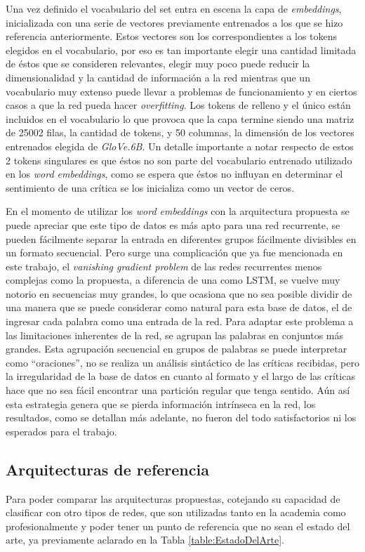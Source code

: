 \documentclass[spanish]{article}
\theoremstyle{definition}
\theoremstyle{remark}
\numberwithin{equation}{section}
\numberwithin{equation}{section} %
\begin{document}
Una vez definido el vocabulario del set entra en escena la capa de \textit{embeddings}, inicializada con una serie de vectores previamente entrenados a los que se hizo referencia anteriormente. Estos vectores son los correspondientes a los tokens elegidos en el vocabulario, por eso es tan importante elegir una cantidad limitada de éstos que se consideren relevantes, elegir muy poco puede reducir la dimensionalidad y la cantidad de información a la red mientras que un vocabulario muy extenso puede llevar a problemas de funcionamiento y en ciertos casos a que la red pueda hacer \textit{overfitting}. Los tokens de relleno y el único están incluidos en el vocabulario lo que provoca que la capa termine siendo una matriz de 25002 filas, la cantidad de tokens, y 50 columnas, la dimensión de los vectores entrenados elegida de \textit{GloVe.6B}. Un detalle importante a notar respecto de estos 2 tokens singulares es que éstos no son parte del vocabulario entrenado utilizado en los \textit{word embeddings}, como se espera que éstos no influyan en determinar el sentimiento de una crítica se los inicializa como un vector de ceros. 
\par
En el momento de utilizar los \textit{word embeddings} con la arquitectura propuesta se puede apreciar que este tipo de datos es más apto para una red recurrente, se pueden fácilmente separar la entrada en diferentes grupos fácilmente divisibles en un formato secuencial. Pero surge una complicación que ya fue mencionada en este trabajo, el \textit{vanishing gradient problem} de las redes recurrentes menos complejas como la propuesta, a diferencia de una como LSTM, se vuelve muy notorio en secuencias muy grandes, lo que ocasiona que no sea posible dividir de una manera que se puede considerar como natural para esta base de datos, el de ingresar cada palabra como una entrada de la red. Para adaptar este problema a las limitaciones inherentes de la red, se agrupan las palabras en conjuntos más grandes. Esta agrupación secuencial en grupos de palabras se puede interpretar como ``oraciones'', no se realiza un análisis sintáctico de las críticas recibidas, pero la irregularidad de la base de datos en cuanto al formato y el largo de las críticas hace que no sea fácil encontrar una partición regular que tenga sentido. Aún así esta estrategia genera que se pierda información intrínseca en la red, los resultados, como se detallan más adelante, no fueron del todo satisfactorios ni los esperados para el trabajo.
\par
  
\subsection{Arquitecturas de referencia}
Para poder comparar las arquitecturas propuestas, cotejando su capacidad de clasificar con otro tipos de redes, que son utilizadas tanto en la academia como profesionalmente y poder tener un punto de referencia que no sean el estado del arte, ya previamente aclarado en la Tabla \ref{table:EstadoDelArte}. \par
\end{document}
